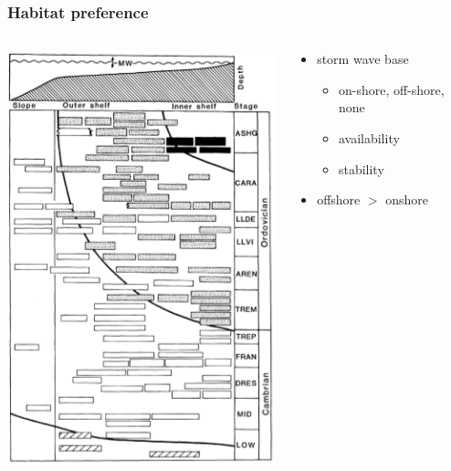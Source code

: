 \documentclass{beamer}
\begin{document}
\begin{frame}
  \frametitle{Habitat preference}

  \begin{columns}
    \begin{column}{0.5\textwidth}
      \begin{center}
        \includegraphics[height = 0.8\textheight, width = \textwidth, keepaspectratio = true]{figure/onoff}

        \tiny{}
      \end{center}
    \end{column}
    \begin{column}{0.5\textwidth}
      \begin{itemize}
        \item storm wave base
          \begin{itemize}
            \item on-shore, off-shore, none
            \item availability
            \item stability
          \end{itemize}
        \item offshore \(>\) onshore
      \end{itemize}
    \end{column}
  \end{columns}
\end{frame}
\end{document}
